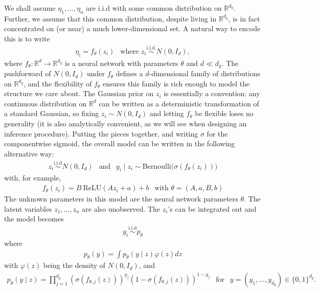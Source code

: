 \documentclass{scrartcl}
\newcommand{\R}{{\mathbb R}}
\begin{document}
We shall assume $\eta_1, \dots, \eta_n$ are i.i.d with some common
distribution on $\R^{d_y}$. Further, we assume that this common
distribution, despite living in $\mathbb{R}^{d_y}$, is in fact
concentrated on (or near) a much lower-dimensional set. A
natural way to encode this is to write 
\begin{align*}
  \eta_i = f_\theta(z_i) ~~ \text{ where } z_i
  \overset{\text{i.i.d.}}{\sim} N(0, I_d), 
\end{align*}
where $f_\theta : \mathbb{R}^d \to \mathbb{R}^{d_y}$ is a neural
network with parameters $\theta$ and $d \ll d_y$. The pushforward of
$N(0, I_d)$ under $f_\theta$ defines a $d$-dimensional family of
distributions on $\mathbb{R}^{d_y}$, and the flexibility of $f_\theta$
ensures this family is rich enough to model the structure we care
about. The Gaussian prior on $z_i$ is essentially a convention: any
continuous distribution on $\mathbb{R}^d$ can be written as a
deterministic transformation of a standard Gaussian, so fixing $z_i
\sim N(0, I_d)$ and letting $f_\theta$ be flexible loses no generality
(it is also analytically convenient, as we will see when designing an
inference procedure). Putting the pieces together, and writing
$\sigma$ for the componentwise sigmoid, the overall model can be
written in the following alternative way:  
\begin{align*}
  z_i \overset{\text{i.i.d}}{\sim} N(0, I_d) ~~ \text{ and } ~~ 
  y_i \mid z_i \sim
  \mathrm{Bernoulli}\bigl(\sigma(f_\theta(z_i))\bigr)
\end{align*}
with, for example,
\begin{align}\label{fth_nn}
f_\theta(z_i) = B~\text{ReLU}(A z_i + a) + b ~~ \text{ with }
\theta = (A, a, B, b)
\end{align}
The unknown parameters in this model are the neural network
parameters $\theta$. The latent variables $z_1, \dots, z_n$ are also
unobserved. The $z_i$'s can be integrated out and the model becomes
\begin{align*}
  y_i \overset{\text{i.i.d}}{\sim} p_{\theta}
\end{align*}
where
\begin{align*}
  p_{\theta}(y) = \int p_{\theta}(y \mid z) \varphi(z) dz
\end{align*}
with $\varphi(z)$ being the density of $N(0, I_d)$, and
\begin{align*}
  p_{\theta}(y \mid z) = \prod_{j=1}^{d_y} \left(\sigma(f_{\theta,
  j}(z)) \right)^{y_j} 
  \left(1 - \sigma(f_{\theta,
  j}(z))\right)^{1 - y_j}  ~~ \text{ for } ~~ y = (y_1, \dots,
  y_{d_y}) \in \{0, 
  1\}^{d_y}. 
\end{align*}
\end{document}
